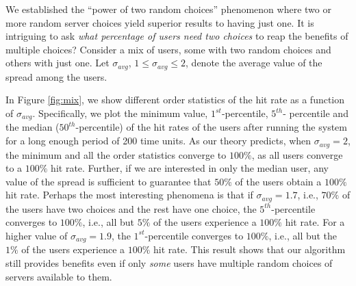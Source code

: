 \documentclass[conference]{IEEEtran}
\newcommand{\comment}[1]{}
\begin{document}
We established the ``power of two random choices'' phenomenon where two or more random server choices yield superior results to having just one. It is intriguing to ask {\em what percentage of users need two choices} to reap the benefits of multiple choices? Consider a mix of users, some with two random choices and others with just one. Let  $\sigma_{avg}$, $1 \leq \sigma_{avg} \leq 2$, denote the average value of the spread among the users.

\comment{
\begin{figure}[ht]
\centering
\texttt{[image: zipfmix.pdf]}
\caption{Order statistics of the hit rate of the user population. ($\alpha=0.65, n_u/n_s = 1, \tau=10,\kappa=2.$)}
\label{fig:mix}
\end{figure}
}

In Figure \ref{fig:mix}, we show different order statistics of the  hit rate as a function of $\sigma_{avg}$. Specifically, we plot the minimum value, $1^{st}$-percentile, $5^{th}$- percentile and the median ($50^{th}$-percentile) of the hit rates of the users after running the system for a long enough period of 200 time units. As our theory predicts, when $\sigma_{avg} = 2$, the minimum and all the order statistics converge to $100\%$, as all users converge to a $100\%$ hit rate. Further, if we are interested in only the median user, any value of the spread is sufficient to guarantee that $50\%$ of the users obtain a $100\%$ hit rate. Perhaps the most interesting phenomena is that if $\sigma_{avg} = 1.7$, i.e., $70\%$ of the users have two choices and the rest have one choice, the $5^{th}$-percentile converges to $100\%$, i.e., all but $5\%$ of the users experience a $100\%$ hit rate. For a higher value of $\sigma_{avg} = 1.9$, the $1^{st}$-percentile converges to $100\%$, i.e., all but the $1\%$ of the users experience a $100\%$ hit rate. This result shows that our algorithm still provides benefits even if only {\em some} users  have multiple random choices of servers available to them.
\end{document}
